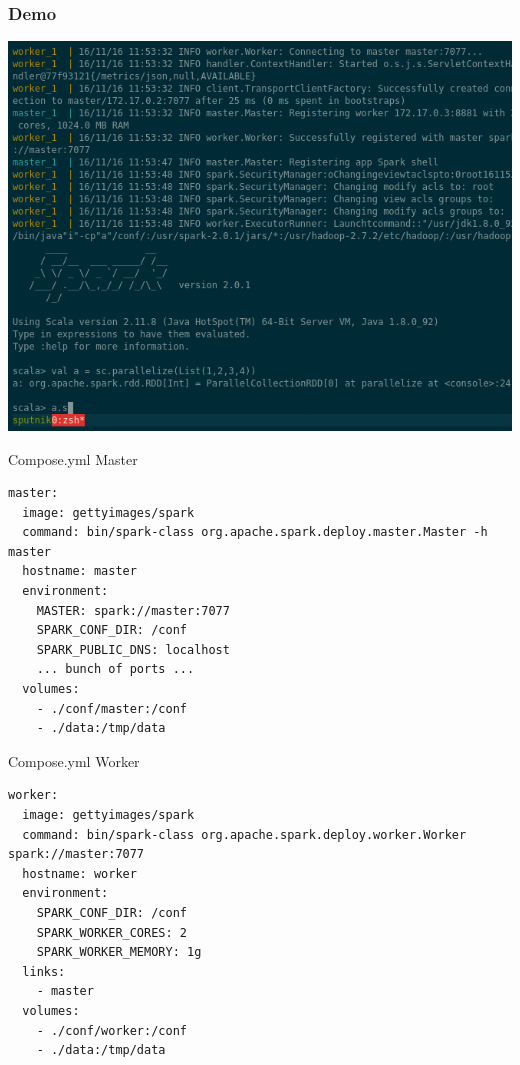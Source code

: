 \documentclass{beamer}
\begin{document}
\begin{frame}[fragile]
  \frametitle{Demo}
  \centering
\href{https://asciinema.org/a/92977}{\includegraphics[width=\textwidth]{gif/sparkrepl-thumb.png}}

\end{frame}
\begin{frame}[fragile]{Compose.yml Master}
\vspace{-2em} %
\begin{lstlisting}[basicstyle=\ttfamily,language={},linebackgroundcolor={
    \btLstHL<1>{2}%
    \btLstHL<2>{3}%
    \btLstHL<3>{11}%
    \btLstHL<4>{12}%
    }]
master:
  image: gettyimages/spark
  command: bin/spark-class org.apache.spark.deploy.master.Master -h master
  hostname: master
  environment:
    MASTER: spark://master:7077
    SPARK_CONF_DIR: /conf
    SPARK_PUBLIC_DNS: localhost
    ... bunch of ports ...
  volumes:
    - ./conf/master:/conf
    - ./data:/tmp/data
  \end{lstlisting}
\end{frame}
\begin{frame}[fragile]{Compose.yml Worker}
\vspace{-2em} %
\begin{lstlisting}[language={},basicstyle=\ttfamily,linebackgroundcolor={
    \btLstHL<1>{2}%
    \btLstHL<2>{3}%
    \btLstHL<3>{12,13}%
    \btLstHL<4>{6-8}%
    }]
worker:
  image: gettyimages/spark
  command: bin/spark-class org.apache.spark.deploy.worker.Worker spark://master:7077
  hostname: worker
  environment:
    SPARK_CONF_DIR: /conf
    SPARK_WORKER_CORES: 2
    SPARK_WORKER_MEMORY: 1g
  links:
    - master
  volumes:
    - ./conf/worker:/conf
    - ./data:/tmp/data
    \end{lstlisting}
\end{frame}
\end{document}
